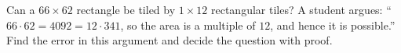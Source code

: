 Can a $66\times62$ rectangle be tiled by $1\times12$ rectangular tiles? A student argues: ``$66\cdot62=4092=12\cdot341$, so the area is a multiple of $12$, and hence it is possible.'' Find the error in this argument and decide the question with proof.
